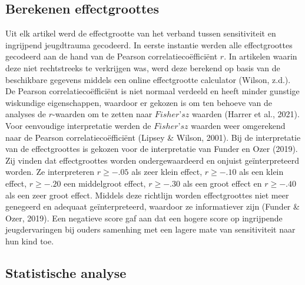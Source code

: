 \documentclass[12pt]{article}
\begin{document}
\subsection{Berekenen effectgroottes}\label{berekenen-effectgroottes}

Uit elk artikel werd de effectgrootte van het verband tussen
sensitiviteit en ingrijpend jeugdtrauma gecodeerd. In eerste instantie
werden alle effectgroottes gecodeerd aan de hand van de Pearson
correlatiecoëfficiënt \(r\). In artikelen waarin deze niet rechtstreeks
te verkrijgen was, werd deze berekend op basis van de beschikbare
gegevens middels een online effectgrootte calculator (Wilson, z.d.). De
Pearson correlatiecoëfficiënt is niet normaal verdeeld en heeft minder
gunstige wiskundige eigenschappen, waardoor er gekozen is om ten behoeve
van de analyses de \(r\)-waarden om te zetten naar \(Fisher’s z\)
waarden (Harrer et al., 2021). Voor eenvoudige interpretatie werden de
\(Fisher’s z\) waarden weer omgerekend naar de Pearson
correlatiecoëfficiënt (Lipsey \& Wilson, 2001). Bij de interpretatie van
de effectgroottes is gekozen voor de interpretatie van Funder en Ozer
(2019). Zij vinden dat effectgroottes worden ondergewaardeerd en onjuist
geïnterpreteerd worden. Ze interpreteren \(r ≥ - .05\) als zeer klein
effect, \(r ≥ -.10\) als een klein effect, \(r ≥ -.20\) een middelgroot
effect, \(r ≥ - .30\) als een groot effect en \(r ≥ -.40\) als een zeer
groot effect. Middels deze richtlijn worden effectgroottes niet meer
genegeerd en adequaat geïnterpreteerd, waardoor ze informatiever zijn
(Funder \& Ozer, 2019). Een negatieve score gaf aan dat een hogere score
op ingrijpende jeugdervaringen bij ouders samenhing met een lagere mate
van sensitiviteit naar hun kind toe.

\subsection{Statistische analyse}\label{statistische-analyse}
\end{document}

